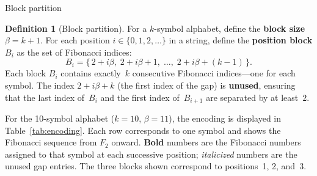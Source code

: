 \documentclass[11pt]{amsart}
\makeatletter
\renewcommand{\subsection}{\@startsection{subsection}{2}%
  \z@{.5\linespacing\@plus.7\linespacing}{-.5em}%
  {\normalfont\bfseries}}
\theoremstyle{plain}
\theoremstyle{definition}
\newtheorem{definition}[theorem]{Definition}
\theoremstyle{remark}
\makeatother
\begin{document}
\subsection{Block partition}

\begin{definition}[Block partition]\label{def:block}
For a $k$-symbol alphabet, define the \textbf{block size} $\beta = k+1$. For each position $i \in \{0, 1, 2, \ldots\}$ in a string, define the \textbf{position block} $B_i$ as the set of Fibonacci indices:
\[
B_i = \bigl\{\, 2 + i\beta,\; 2 + i\beta + 1,\; \ldots,\; 2 + i\beta + (k-1) \,\bigr\}.
\]
Each block $B_i$ contains exactly~$k$ consecutive Fibonacci indices---one for each symbol. The index $2 + i\beta + k$ (the first index of the gap) is \textbf{unused}, ensuring that the last index of~$B_i$ and the first index of~$B_{i+1}$ are separated by at least~$2$.
\end{definition}

For the 10-symbol alphabet ($k=10$, $\beta=11$), the encoding is displayed in Table~\ref{tab:encoding}. Each row corresponds to one symbol and shows the Fibonacci sequence from $F_2$ onward. \textbf{Bold} numbers are the Fibonacci numbers assigned to that symbol at each successive position; \textit{italicized} numbers are the unused gap entries. The three blocks shown correspond to positions~1, 2, and~3.
\end{document}
